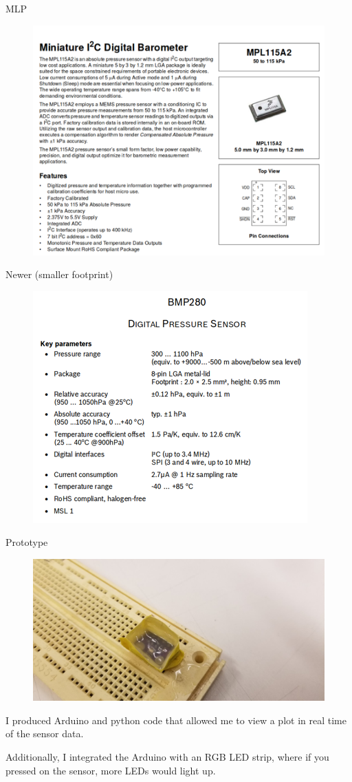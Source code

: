 \documentclass[12pt]{article}
\begin{document}
MLP
\begin{figure}[H]
\centering
\includegraphics[width=.5\textwidth]{images/sensor/old_datasheet.png}
\end{figure}

Newer (smaller footprint)
\begin{figure}[H]
\centering
\includegraphics[width=.5\textwidth]{images/sensor/new_datasheet.png}
\end{figure}

Prototype
\begin{figure}[H]
\centering
\includegraphics[width=.5\textwidth]{images/sensor/SENSOR.png}
\end{figure}

I produced Arduino and python code that allowed me to view a plot in real time of the sensor data.

Additionally, I integrated the Arduino with an RGB LED strip, where if you pressed on the sensor,
more LEDs would light up.
\end{document}
